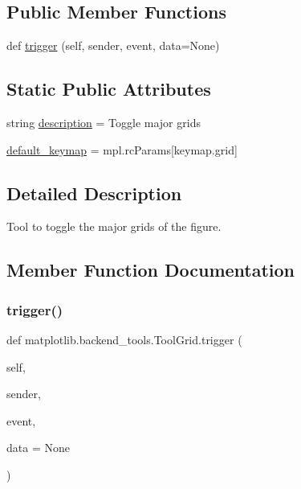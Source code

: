 \subsection*{Public Member Functions}
\begin{DoxyCompactItemize}
\item 
def \hyperlink{classmatplotlib_1_1backend__tools_1_1ToolGrid_a630b1589b7207262ff28b22fe4e01ae7}{trigger} (self, sender, event, data=None)
\end{DoxyCompactItemize}
\subsection*{Static Public Attributes}
\begin{DoxyCompactItemize}
\item 
string \hyperlink{classmatplotlib_1_1backend__tools_1_1ToolGrid_ac641e43fa4acfb06630e394715152580}{description} = \textquotesingle{}Toggle major grids\textquotesingle{}
\item 
\hyperlink{classmatplotlib_1_1backend__tools_1_1ToolGrid_aeb523a9387f2fcb0d934e31662dd1ccf}{default\+\_\+keymap} = mpl.\+rc\+Params\mbox{[}\textquotesingle{}keymap.\+grid\textquotesingle{}\mbox{]}
\end{DoxyCompactItemize}


\subsection{Detailed Description}
\begin{DoxyVerb}Tool to toggle the major grids of the figure.\end{DoxyVerb}
 

\subsection{Member Function Documentation}
\mbox{\label{classmatplotlib_1_1backend__tools_1_1ToolGrid_a630b1589b7207262ff28b22fe4e01ae7}} 
\subsubsection{\texorpdfstring{trigger()}{trigger()}}
{\footnotesize\ttfamily def matplotlib.\+backend\+\_\+tools.\+Tool\+Grid.\+trigger (\begin{DoxyParamCaption}\item[{}]{self,  }\item[{}]{sender,  }\item[{}]{event,  }\item[{}]{data = {\ttfamily None} }\end{DoxyParamCaption})}



